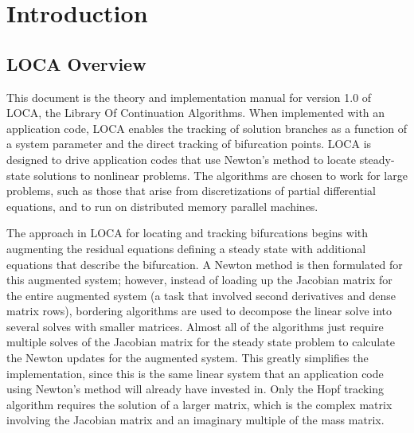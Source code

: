 \chapter{Introduction}

\section{LOCA Overview}

This document is the theory and implementation manual for version 1.0 of LOCA, the Library Of Continuation Algorithms. When implemented with an application code, LOCA enables the tracking of solution branches as a function of a system parameter and the direct tracking of bifurcation points. LOCA is designed to drive application codes that use Newton's method to locate steady-state solutions to nonlinear problems. The algorithms are chosen to work for large problems, such as those that arise from discretizations of partial differential equations, and to run on distributed memory parallel machines.

The approach in LOCA for locating and tracking bifurcations begins with augmenting the residual equations defining a steady state with additional equations that describe the bifurcation. A Newton method is then formulated for this augmented system; however, instead of loading up the Jacobian matrix for the entire augmented system (a task that involved second derivatives and dense matrix rows), bordering algorithms are used to decompose the linear solve into several solves with smaller matrices. Almost all of the algorithms just require multiple solves of the Jacobian matrix for the steady state problem to calculate the Newton updates for the augmented system. This greatly simplifies the implementation, since this is the same linear system that an application code using Newton's method will already have invested in. Only the Hopf tracking algorithm requires the solution of a larger matrix, which is the complex matrix involving the Jacobian matrix and an imaginary multiple of the mass matrix.

